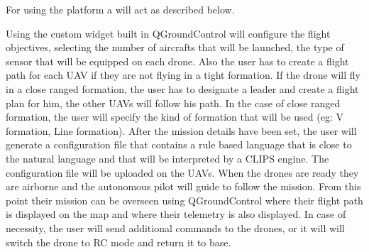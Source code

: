 For using the platform a will act as described below.

Using the custom widget built in QGroundControl will configure the flight objectives, 
selecting the number of aircrafts that will be launched, the type of sensor that
will be equipped on each drone. Also the user has to create a flight path for 
each UAV if they are not flying in a tight formation. If the drone will fly in 
a close ranged formation, the user has to designate a leader and create a flight
plan for him, the other UAVs will follow his path. In the case of close ranged 
formation, the user will specify the kind of formation that will be used (eg: 
  V formation, Line formation). After the mission details have been set, the user
will generate a configuration file that contains a rule based language that
is close to the natural language and that will be interpreted by a CLIPS engine.
The configuration file will be uploaded on the UAVs. When the drones are ready
they are airborne and the autonomous pilot will guide to follow the mission.
From this point their mission can be overseen using QGroundControl where their
flight path is displayed on the map and where their telemetry is also displayed.
In case of necessity, the user will send additional commands to the drones, or
it will will switch the drone to RC mode and return it to base.

